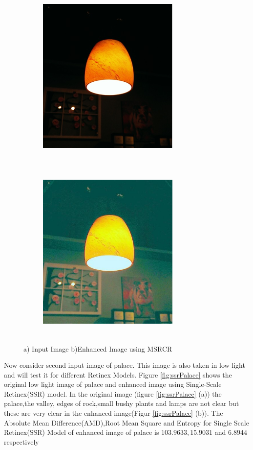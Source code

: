 \begin{figure}
	\begin{subfigure}{8cm}
		\centering    
    	\includegraphics[width=7cm,height=9cm,keepaspectratio]{images/ch5/bulb_input.jpg}
    	\caption{} 
    \end{subfigure}
  	\begin{subfigure}{6cm}
  		\centering
  		\includegraphics[width=7cm,height=9cm,keepaspectratio]{images/ch5/bulb_msrcr.jpg}
   		\caption{}
  	\end{subfigure}
  	\caption{a) Input Image b)Enhanced Image using MSRCR}
  	\label{fig:msrcr}
\end{figure}


Now consider second input image of palace. This image is also taken in low light and will test it for different Retinex Models. Figure \ref{fig:ssrPalace} shows the original low light image of palace and enhanced image using Single-Scale Retinex(SSR) model. In the original image (figure \ref{fig:ssrPalace} (a))  the palace,the valley, edges of rock,small bushy plants and lamps are not clear but these are very clear in the enhanced image(Figur \ref{fig:ssrPalace} (b)). The Absolute Mean Difference(AMD),Root Mean Square and Entropy for Single Scale Retinex(SSR) Model of enhanced image of palace is $103.9633,15.9031$ and $6.8944$ respectively      


